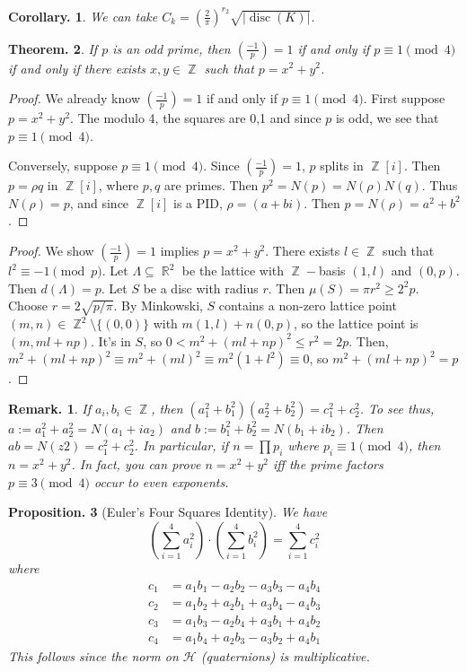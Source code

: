 \documentclass[11pt, a4paper]{memoir}
\DeclareMathOperator{\Z}{{\mathbb{Z}}}
\DeclareMathOperator{\R}{{\mathbb{R}}}
\theoremstyle{change}
\newtheorem{theorem}{Theorem.}[section]
\newtheorem{corollary}[theorem]{Corollary.}
\newtheorem{proposition}[theorem]{Proposition.}
\theoremstyle{plain}
\theoremstyle{nonumberplain}
\newtheorem{remark}{Remark.}
\newtheorem{proof}{Proof}
\DeclareMathOperator{\disc}{disc}
\newcommand{\lgs}[2]{\ensuremath{\left(\frac{#1}{#2}\right)}}
\numberwithin{equation}{section}
\begin{document}
\begin{corollary}
    We can take $C_k=\left(\frac{2}{\pi}\right)^{r_2}\sqrt{|\disc(K)|}$.
\end{corollary}
\begin{theorem}
    If $p$ is an odd prime, then $\lgs{-1}{p}=1$ if and only if $p\equiv 1\pmod{4}$ if and only if there exists $x,y\in\Z$ such that $p=x^2+y^2$.
\end{theorem}
\begin{proof}
    We already know $\lgs{-1}{p}=1$ if and only if $p\equiv 1\pmod{4}$.
    First suppose $p=x^2+y^2$.
    The modulo 4, the squares are 0,1 and since $p$ is odd, we see that $p\equiv 1\pmod{4}$.

    Conversely, suppose $p\equiv 1\pmod{4}$.
    Since $\lgs{-1}{p}=1$, $p$ splits in $\Z[i]$.
    Then $p=\rho q$ in $\Z[i]$, where $p,q$ are primes.
    Then $p^2=N(p)=N(\rho)N(q)$.
    Thus $N(\rho)=p$, and since $\Z[i]$ is a PID, $\rho=(a+bi)$.
    Then $p=N(\rho)=a^2+b^2$.
\end{proof}
\begin{proof}
    We show $\lgs{-1}{p}=1$ implies $p=x^2+y^2$.
    There exists $l\in\Z$ such that $l^2\equiv -1\pmod{p}$.
    Let $\Lambda\subseteq\R^2$ be the lattice with $\Z-$basis $(1,l)$ and $(0,p)$.
    Then $d(\Lambda)=p$.
    Let $S$ be a disc with radius $r$.
    Then $\mu(S)=\pi r^2\geq 2^2p$.
    Choose $r=2\sqrt{p/\pi}$.
    By Minkowski, $S$ contains a non-zero lattice point $(m,n)\in\Z^2\setminus\{(0,0)\}$ with $m(1,l)+n(0,p)$, so the lattice point is $(m,ml+np)$.
    It's in $S$, so $0<m^2+(ml+np)^2\leq r^2=2p$.
    Then, $m^2+(ml+np)^2\equiv m^2+(ml)^2\equiv m^2(1+l^2)\equiv 0$, so $m^2+(ml+np)^2=p$.
\end{proof}
\begin{remark}
    If $a_i,b_i\in\Z$, then $(a_1^2+b_1^2)(a_2^2+b_2^2)=c_1^2+c_2^2$.
    To see thus, $a:=a_1^2+a_2^2=N(a_1+ia_2)$ and $b:=b_1^2+b_2^2=N(b_1+ib_2)$.
    Then $ab=N(z2)=c_1^2+c_2^2$.
    In particular, if $n=\prod p_i$ where $p_i\equiv 1\pmod{4}$, then $n=x^2+y^2$.
    In fact, you can prove $n=x^2+y^2$ iff the prime factors $p\equiv 3\pmod{4}$ occur to even exponents.
\end{remark}
\begin{proposition}[Euler's Four Squares Identity]
    We have
    \begin{equation*}
        \left(\sum_{i=1}^4 a_i^2\right)\cdot\left(\sum_{i=1}^4 b_i^2\right)=\sum_{i=1}^4 c_i^2
    \end{equation*}
    where
    \begin{align*}
        c_1 &= a_1b_1-a_2b_2-a_3b_3-a_4b_4\\
        c_2 &= a_1b_2+a_2b_1+a_3b_4-a_4b_3\\
        c_3 &= a_1b_3-a_2b_4+a_3b_1+a_4b_2\\
        c_4 &= a_1b_4+a_2b_3-a_3b_2+a_4b_1
    \end{align*}
    This follows since the norm on $\mathcal{H}$ (quaternions) is multiplicative.
\end{proposition}
\end{document}
